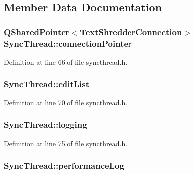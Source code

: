 \subsection{Member Data Documentation}
\hypertarget{class_sync_thread_a74e422ec07a67819e7151249e120ccee}{
\subsubsection[{connectionPointer}]{\setlength{\rightskip}{0pt plus 5cm}QSharedPointer$<${\bf TextShredderConnection}$>$ {\bf SyncThread::connectionPointer}}}
\label{class_sync_thread_a74e422ec07a67819e7151249e120ccee}


Definition at line 66 of file syncthread.h.

\hypertarget{class_sync_thread_ae3f0fa19b2a0f7ac9abd8ca6d794e616}{
\subsubsection[{editList}]{ {\bf SyncThread::editList}}}
\label{class_sync_thread_ae3f0fa19b2a0f7ac9abd8ca6d794e616}


Definition at line 70 of file syncthread.h.

\hypertarget{class_sync_thread_ae651d8e4d10f0ecc03da63980712aebd}{
\subsubsection[{logging}]{ {\bf SyncThread::logging}}}
\label{class_sync_thread_ae651d8e4d10f0ecc03da63980712aebd}


Definition at line 75 of file syncthread.h.

\hypertarget{class_sync_thread_a57da771fcaa20bf99c5987ed92ad5c33}{
\subsubsection[{performanceLog}]{ {\bf SyncThread::performanceLog}}}
\label{class_sync_thread_a57da771fcaa20bf99c5987ed92ad5c33}


